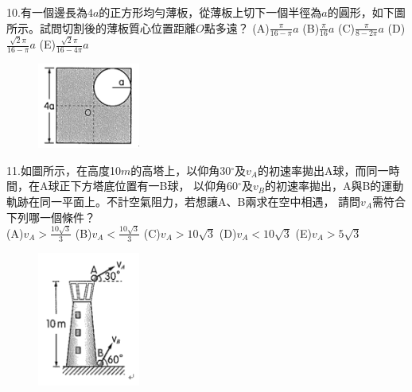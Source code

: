 \documentclass[cn,10pt,math=newtx]{elegantbook}
\begin{document}
\begin{example}
   10.有一個邊長為$4a$的正方形均勻薄板，從薄板上切下一個半徑為$a$的圓形，如下圖所示。試問切割後的薄板質心位置距離$O$點多遠？
   (A)$\frac{\pi}{16-\pi}a$ (B)$\frac{\pi}{16}a$ (C)$\frac{\pi}{8-2\pi}a$ 
   (D)$\frac{\sqrt{2} \pi}{16-\pi}a$ (E)$\frac{\sqrt{2} \pi}{16-4\pi}a$\\
    \rightline{[成德高中教甄109]}
\end{example}
\begin{solution}
    
\end{solution}
\begin{figure}[htbp]
    \flushright
    \includegraphics[width=0.3\textwidth]{image/109成德10.png}
  \end{figure}
\newpage

\begin{example}
   11.如圖所示，在高度10$m$的高塔上，以仰角30$^\circ$及$v_A$的初速率拋出A球，而同一時間，在A球正下方塔底位置有一B球，
   以仰角60$^\circ$及$v_B$的初速率拋出，A與B的運動軌跡在同一平面上。不計空氣阻力，若想讓A、B兩求在空中相遇，
   請問$v_A$需符合下列哪一個條件？\\
   (A)$v_A > \frac{10\sqrt{3}}{3}$ (B)$v_A < \frac{10\sqrt{3}}{3}$ (C)$v_A > 10\sqrt{3}$ 
   (D)$v_A < 10\sqrt{3}$ (E)$v_A > 5\sqrt{3}$\\
    \rightline{[成德高中教甄109]}
\end{example}
\begin{solution}
    
\end{solution}
\begin{figure}[htbp]
    \flushright
    \includegraphics[width=0.3\textwidth]{image/109成德11.png}
  \end{figure}
\newpage
\end{document}

